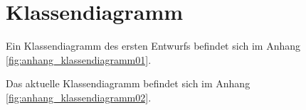 \section{Klassendiagramm}
\label{sec:Klassendiagramm}

Ein Klassendiagramm des ersten Entwurfs befindet sich im Anhang \vref{fig:anhang_klassendiagramm01}.

Das aktuelle Klassendiagramm befindet sich im Anhang \vref{fig:anhang_klassendiagramm02}.
